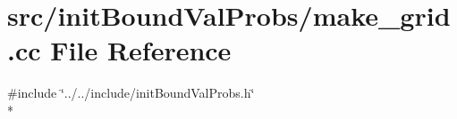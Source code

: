 \section{src/init\-Bound\-Val\-Probs/make\-\_\-grid.cc File Reference}
\label{make__grid_8cc}
{\ttfamily \#include \char`\"{}../../include/init\-Bound\-Val\-Probs.\-h\char`\"{}}\\*
